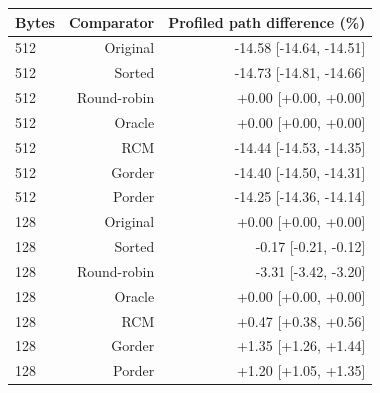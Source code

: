 \begin{tabular}{lrr}
\toprule
Bytes & Comparator & Profiled path difference (\%) \\
\midrule
512 & Original & -14.58 [-14.64, -14.51] \\
512 & Sorted & -14.73 [-14.81, -14.66] \\
512 & Round-robin & +0.00 [+0.00, +0.00] \\
512 & Oracle & +0.00 [+0.00, +0.00] \\
512 & RCM & -14.44 [-14.53, -14.35] \\
512 & Gorder & -14.40 [-14.50, -14.31] \\
512 & Porder & -14.25 [-14.36, -14.14] \\
128 & Original & +0.00 [+0.00, +0.00] \\
128 & Sorted & -0.17 [-0.21, -0.12] \\
128 & Round-robin & -3.31 [-3.42, -3.20] \\
128 & Oracle & +0.00 [+0.00, +0.00] \\
128 & RCM & +0.47 [+0.38, +0.56] \\
128 & Gorder & +1.35 [+1.26, +1.44] \\
128 & Porder & +1.20 [+1.05, +1.35] \\
\bottomrule
\end{tabular}
